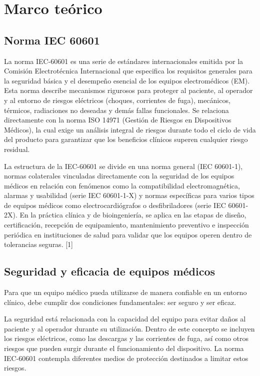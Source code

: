 \section{Marco teórico}    

\subsection{Norma IEC 60601}
La norma IEC-60601 es una serie de estándares internacionales emitida por la Comisión Electrotécnica Internacional que
especifica los requisitos generales para la seguridad básica y el desempeño esencial de los equipos electromédicos (EM). 
Esta norma describe mecanismos rigurosos para proteger al paciente, al operador y al entorno de riesgos eléctricos (choques,
corrientes de fuga), mecánicos, térmicos, radiaciones no deseadas y demás fallas funcionales. Se relaciona directamente con
la norma ISO 14971 (Gestión de Riesgos en Dispositivos Médicos), la cual exige un análisis integral de riesgos durante todo el
ciclo de vida del producto para garantizar que los beneficios clínicos superen cualquier riesgo residual.

La estructura de la IEC-60601 se divide en una norma general (IEC 60601-1), normas colaterales 
vinculadas directamente con la seguridad de los equipos médicos en relación con fenómenos como la
compatibilidad electromagnética, alarmas y usabilidad (serie IEC 60601-1-X) y normas específicas para varios tipos de equipos médicos como electrocardiógrafos o desfibriladores
(serie IEC 60601-2X). En la práctica clínica y de bioingeniería, se aplica en las etapas
de diseño, certificación, recepción de equipamiento, mantenimiento preventivo e inspección periódica en instituciones de salud
para validar que los equipos operen dentro de tolerancias seguras. [1]

\subsection{Seguridad y eficacia de equipos médicos}
Para que un equipo médico pueda utilizarse de manera confiable en un entorno clínico, 
debe cumplir dos condiciones fundamentales: ser seguro y ser eficaz.

La seguridad está relacionada con la capacidad del equipo para evitar daños al paciente y al operador durante 
su utilización. Dentro de este concepto se incluyen los riesgos eléctricos, como las descargas y las corrientes de fuga,
 así como otros riesgos que pueden surgir durante el funcionamiento del dispositivo. La norma IEC-60601 contempla 
diferentes medios de protección destinados a limitar estos riesgos.

